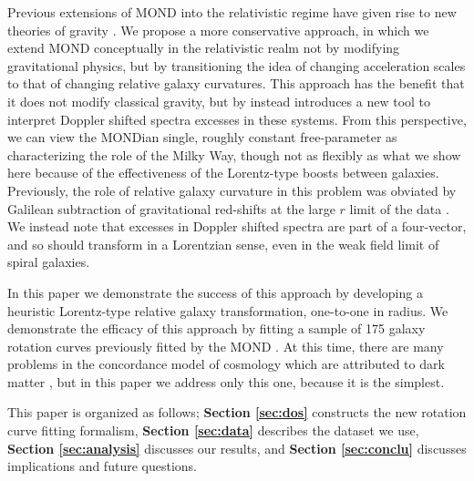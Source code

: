 \documentclass[reprint,%
 amsmath,amssymb,
 aps,
]{revtex4-1}
\begin{document}
  
  Previous extensions of MOND into the relativistic regime have given rise to  new theories of gravity  \cite{PhysRevD.70.083509,doi:10.1142/S0217751X0703666X,Famaey2012}.  
  We    propose    a more conservative approach, 
  in which we extend MOND conceptually in the relativistic realm not by modifying gravitational physics, but by transitioning the idea of changing acceleration scales to that of changing relative galaxy curvatures. 
  This approach has the benefit that it does not 
 modify  classical gravity,  but by instead introduces a new tool to interpret   Doppler shifted spectra excesses in these systems.   From this perspective, we can view the MONDian single, roughly constant free-parameter as characterizing the role of the Milky Way, though not as flexibly as what we show here because of the effectiveness of the Lorentz-type boosts between galaxies. 
   Previously, the role of relative
     galaxy curvature  in this problem was obviated 
       by  Galilean subtraction of   gravitational red-shifts at the  large $r$  limit of the data \citep{MTW}. 
       We instead note that   excesses in Doppler shifted spectra are part of a four-vector, and so should transform in a   Lorentzian sense, even in the weak field limit of spiral galaxies.
       
       
  In this paper we    demonstrate the success of this approach by developing a heuristic Lorentz-type relative galaxy transformation,   one-to-one in radius. 
  We demonstrate the efficacy of this approach by fitting   a sample of 175 galaxy rotation curves previously fitted by the MOND   \cite{McGaugh2016RAR,2016Lelli,McGaugh_2014,Li_2018}.  At this time, there are many problems in   the concordance model of   cosmology which are attributed to dark matter \cite{2010dmp..book.....S,Tully:2014gfa,Naidu_2022}, but in
 this paper we address only this  one, because it is the simplest.  
  
 
 
 
This paper  is organized as follows;
{\bf Section \ref{sec:dos}} constructs  the new rotation curve  fitting formalism, 
{\bf Section \ref{sec:data}}   describes  the dataset we use, 
 {\bf Section \ref{sec:analysis}}   discusses our results, 
 and  {\bf Section \ref{sec:conclu}}   discusses implications and future questions.   
  
\end{document}
